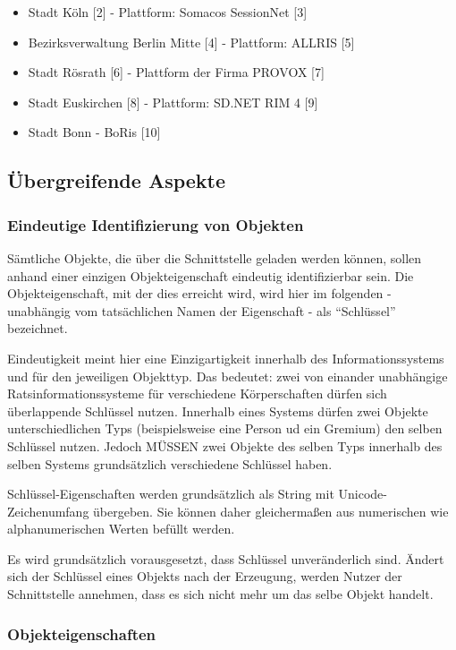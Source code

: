 \documentclass[,a4paper]{article}
\begin{document}
\begin{itemize}
\item
  Stadt Köln {[}2{]} - Plattform: Somacos SessionNet {[}3{]}
\item
  Bezirksverwaltung Berlin Mitte {[}4{]} - Plattform: ALLRIS {[}5{]}
\item
  Stadt Rösrath {[}6{]} - Plattform der Firma PROVOX {[}7{]}
\item
  Stadt Euskirchen {[}8{]} - Plattform: SD.NET RIM 4 {[}9{]}
\item
  Stadt Bonn - BoRis {[}10{]}
\end{itemize}

\subsection{Übergreifende Aspekte}

\subsubsection{Eindeutige Identifizierung von Objekten}

Sämtliche Objekte, die über die Schnittstelle geladen werden können,
sollen anhand einer einzigen Objekteigenschaft eindeutig identifizierbar
sein. Die Objekteigenschaft, mit der dies erreicht wird, wird hier im
folgenden - unabhängig vom tatsächlichen Namen der Eigenschaft - als
``Schlüssel'' bezeichnet.

Eindeutigkeit meint hier eine Einzigartigkeit innerhalb des
Informationssystems und für den jeweiligen Objekttyp. Das bedeutet: zwei
von einander unabhängige Ratsinformationssysteme für verschiedene
Körperschaften dürfen sich überlappende Schlüssel nutzen. Innerhalb
eines Systems dürfen zwei Objekte unterschiedlichen Typs (beispielsweise
eine Person ud ein Gremium) den selben Schlüssel nutzen. Jedoch MÜSSEN
zwei Objekte des selben Typs innerhalb des selben Systems grundsätzlich
verschiedene Schlüssel haben.

Schlüssel-Eigenschaften werden grundsätzlich als String mit
Unicode-Zeichenumfang übergeben. Sie können daher gleichermaßen aus
numerischen wie alphanumerischen Werten befüllt werden.

Es wird grundsätzlich vorausgesetzt, dass Schlüssel unveränderlich sind.
Ändert sich der Schlüssel eines Objekts nach der Erzeugung, werden
Nutzer der Schnittstelle annehmen, dass es sich nicht mehr um das selbe
Objekt handelt.

\subsubsection{Objekteigenschaften}
\end{document}
